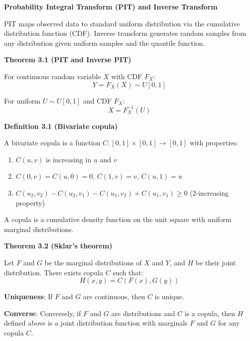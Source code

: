 \documentclass[12pt,a4paper]{article}
\begin{document}
\vspace{0.5em}

\textbf{Probability Integral Transform (PIT) and Inverse Transform}

PIT maps observed data to standard uniform distribution via the cumulative distribution function (CDF). Inverse transform generates random samples from any distribution given uniform samples and the quantile function.

\vspace{0.5em}

\textbf{Theorem 3.1 (PIT and Inverse PIT)}

For continuous random variable $X$ with CDF $F_X$:
\[
Y = F_X(X) \sim U[0,1]
\]

For uniform $U \sim U[0,1]$ and CDF $F_X$:
\[
X = F_X^{-1}(U)
\]

\vspace{0.5em}

\textbf{Definition 3.1 (Bivariate copula)}

A bivariate copula is a function $C : [0,1] \times [0,1] \to [0,1]$ with properties:

\begin{enumerate}
    \item $C(u,v)$ is increasing in $u$ and $v$
    \item $C(0,v) = C(u,0) = 0$, $C(1,v) = v$, $C(u,1) = u$
    \item $C(u_2, v_2) - C(u_2, v_1) - C(u_1, v_2) + C(u_1, v_1) \geq 0$ (2-increasing property)
\end{enumerate}

A copula is a cumulative density function on the unit square with uniform marginal distributions.

\vspace{0.5em}

\textbf{Theorem 3.2 (Sklar's theorem)}

Let $F$ and $G$ be the marginal distributions of $X$ and $Y$, and $H$ be their joint distribution. There exists copula $C$ such that:
\[
H(x,y) = C(F(x), G(y))
\]

\textbf{Uniqueness}: If $F$ and $G$ are continuous, then $C$ is unique.

\textbf{Converse}: Conversely, if $F$ and $G$ are distributions and $C$ is a copula, then $H$ defined above is a joint distribution function with marginals $F$ and $G$ for any copula $C$.

\vspace{0.5em}
\end{document}
